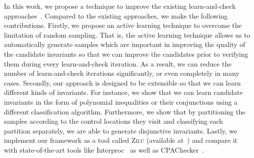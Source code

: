 In this work, we propose a technique to improve the existing learn-and-check approaches~\cite{sharma2012interpolants,sharma2013verification,DBLP:conf/esop/0001GHALN13,sharma2014invariant}.
Compared to the existing approaches, we make the following contributions.
Firstly, we propose an active learning technique to overcome the limitation of random sampling.
That is, the active learning technique allows us to automatically generate samples which are important in improving the quality of the candidate invariants
so that we can improve the candidates prior to verifying them during every learn-and-check iteration.
As a result, we can reduce the number of learn-and-check iterations significantly, or even completely in many cases.
Secondly, our approach is designed to be extensible so that we can learn different kinds of invariants.
For instance, we show that we can learn candidate invariants in the form of polynomial inequalities or their conjunctions using a different classification algorithm.
Furthermore, we show that by partitioning the samples according to the control locations they visit and classifying each partition separately, we are able to generate disjunctive invariants. Lastly, we implement our framework as a tool called \textsc{Zilu} (available at~\cite{zilu:repo}) and compare it with state-of-the-art tools like Interproc~\cite{jeannet2010interproc} as well as CPAChecker~\cite{DBLP:conf/cav/BeyerK11}.
